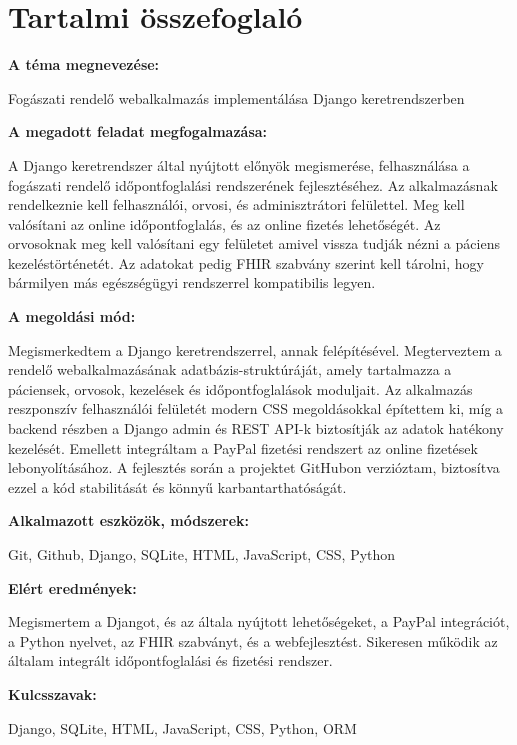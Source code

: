 \chapter*{Tartalmi összefoglaló}

\noindent\textbf{A téma megnevezése:}

\noindent Fogászati rendelő webalkalmazás implementálása Django keretrendszerben

\noindent\textbf{A megadott feladat megfogalmazása:}

\noindent A Django keretrendszer által nyújtott előnyök megismerése, felhasználása a fogászati rendelő időpontfoglalási rendszerének fejlesztéséhez. Az alkalmazásnak rendelkeznie kell felhasználói, orvosi, és adminisztrátori felülettel. Meg kell valósítani az online időpontfoglalás, és az online fizetés lehetőségét. Az orvosoknak meg kell valósítani egy felületet amivel vissza tudják nézni a páciens kezeléstörténetét. Az adatokat pedig FHIR szabvány szerint kell tárolni, hogy bármilyen más egészségügyi rendszerrel kompatibilis legyen.\cite{FHIR}

\noindent\textbf{A megoldási mód:}

\noindent Megismerkedtem a Django keretrendszerrel, annak felépítésével. Megterveztem a rendelő webalkalmazásának adatbázis-struktúráját, amely tartalmazza a páciensek, orvosok, kezelések és időpontfoglalások moduljait. Az alkalmazás reszponszív felhasználói felületét modern CSS megoldásokkal építettem ki, míg a backend részben a Django admin és REST API-k biztosítják az adatok hatékony kezelését. Emellett integráltam a PayPal fizetési rendszert az online fizetések lebonyolításához. A fejlesztés során a projektet GitHubon verzióztam, biztosítva ezzel a kód stabilitását és könnyű karbantarthatóságát.

\noindent\textbf{Alkalmazott eszközök, módszerek:}

\noindent Git, Github, Django, SQLite, HTML, JavaScript, CSS, Python

\noindent\textbf{Elért eredmények:}

\noindent Megismertem a Djangot, és az általa nyújtott lehetőségeket, a PayPal integrációt, a Python nyelvet, az FHIR szabványt, és a webfejlesztést. Sikeresen működik az általam integrált időpontfoglalási és fizetési rendszer.

\noindent\textbf{Kulcsszavak:}

\noindent Django, SQLite, HTML, JavaScript, CSS, Python, ORM
